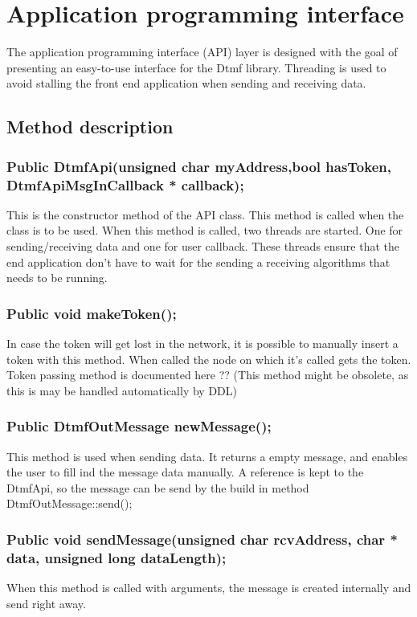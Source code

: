\section{Application programming interface}
The application programming interface (API) layer is designed with the goal of presenting an easy-to-use interface for the Dtmf library. Threading is used to avoid stalling the front end application when sending and receiving data. 
\subsection{Method description}
\subsubsection*{Public DtmfApi(unsigned char myAddress,bool hasToken, DtmfApiMsgInCallback * callback);}
This is the constructor method of the API class. This method is called when the class is to be used.
When this method is called, two threads are started. One for sending/receiving data and one for user callback. These threads ensure that the end application don't have to wait for the sending a receiving algorithms that needs to be running.

\subsubsection*{Public void makeToken();}
In case the token will get lost in the network, it is possible to manually insert a token with this method. When called the node on which it's called gets the token. Token passing method is documented here ?? (This method might be obsolete, as this is may be handled automatically by DDL)

\subsubsection*{Public DtmfOutMessage newMessage();}
This method is used when sending data. It returns a empty message, and enables the user to fill ind the message data manually. A reference is kept to the DtmfApi, so the message can be send by the build in method DtmfOutMessage::send();

\subsubsection*{Public void sendMessage(unsigned char rcvAddress, char * data, unsigned long dataLength);}
When this method is called with arguments, the message is created internally and send right away.

